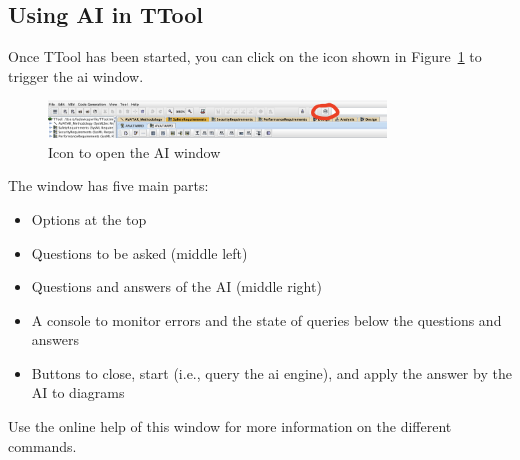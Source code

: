 \documentclass[12pt]{article}
\begin{document}
\subsection{Using AI in TTool}
Once TTool has been started, you can click on the icon shown in Figure~\ref{fig:icon} to trigger the ai window.

\begin{figure}[h!]
\centering
\includegraphics[width=0.8\textwidth]{fig/openingaiwindow.png}
\caption{Icon to open the AI window}
\label{fig:icon}
\end{figure}

The window has five main parts:
\begin{itemize}
    \item Options at the top
    \item Questions to be asked (middle left)
    \item Questions and answers of the AI (middle right)
    \item A console to monitor errors and the state of queries below the questions and answers
    \item Buttons to close, start (i.e., query the ai engine), and apply the answer by the AI to diagrams
\end{itemize}

Use the online help of this window for more information on the different commands.
\end{document}
